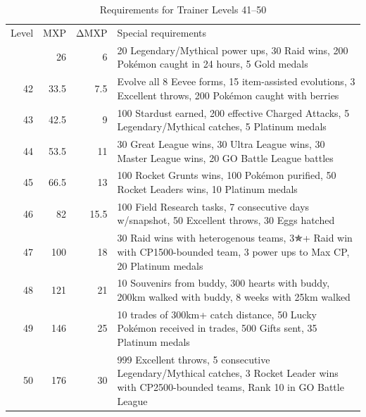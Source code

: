 \begin{table}[ht]
\begin{center}
  \begin{tabular}{r r r p{}}
Level & MXP & ΔMXP & Special requirements \\
\Midrule
41 & 26 & 6 & 20 Legendary/Mythical power ups,
                      30 Raid wins,
                      200 Pokémon caught in 24 hours,
                      5 Gold medals\\
42 & 33.5 & 7.5 & Evolve all 8 Eevee forms,
                      15 item-assisted evolutions,
                      3 Excellent throws,
                      200 Pokémon caught with berries \\
43 & 42.5 & 9 & 100 Stardust earned,
                      200 effective Charged Attacks,
                      5 Legendary/Mythical catches,
                      5 Platinum medals \\
44 & 53.5 & 11 & 30 Great League wins,
                       30 Ultra League wins,
                       30 Master League wins,
                       20 GO Battle League battles \\
45 & 66.5 & 13 & 100 Rocket Grunts wins,
                       100 Pokémon purified,
                       50 Rocket Leaders wins,
                       10 Platinum medals\\
46 & 82 & 15.5 & 100 Field Research tasks,
                       7 consecutive days w/snapshot,
                       50 Excellent throws,
                       30 Eggs hatched\\
47 & 100 & 18 & 30 Raid wins with heterogenous teams,
                        3{\symbolfont ✯}+ Raid win with CP1500-bounded team,
                        3 power ups to Max CP,
                        20 Platinum medals\\
48 & 121 & 21 & 10 Souvenirs from buddy,
                        300 hearts with buddy,
                        200km walked with buddy,
                        8 weeks with 25km walked\\
49 & 146 & 25 & 10 trades of 300km+ catch distance,
                        50 Lucky Pokémon received in trades,
                        500 Gifts sent,
                        35 Platinum medals\\
50 & 176 & 30 & 999 Excellent throws,
                        5 consecutive Legendary/Mythical catches,
                        3 Rocket Leader wins with CP2500-bounded teams,
                        Rank 10 in GO Battle League\\
\end{tabular}
\caption{Requirements for Trainer Levels 41--50}
\label{table:xp41plus}
\end{center}
\end{table}
